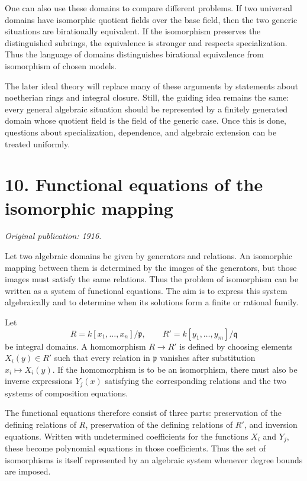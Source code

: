 \documentclass[12pt]{article}
\begin{document}
One can also use these domains to compare different problems. If two universal domains have
isomorphic quotient fields over the base field, then the two generic situations are birationally
equivalent. If the isomorphism preserves the distinguished subrings, the equivalence is stronger and
respects specialization. Thus the language of domains distinguishes birational equivalence from
isomorphism of chosen models.

The later ideal theory will replace many of these arguments by statements about noetherian rings and
integral closure. Still, the guiding idea remains the same: every general algebraic situation should
be represented by a finitely generated domain whose quotient field is the field of the generic case.
Once this is done, questions about specialization, dependence, and algebraic extension can be
treated uniformly.


\section{10. Functional equations of the isomorphic mapping}

\textit{Original publication: 1916.}

Let two algebraic domains be given by generators and relations. An isomorphic mapping between them
is determined by the images of the generators, but those images must satisfy the same relations.
Thus the problem of isomorphism can be written as a system of functional equations. The aim is to
express this system algebraically and to determine when its solutions form a finite or rational
family.


Let \[   R=k[x_1, \ldots,x_n]/\mathfrak p,   \qquad   R'=k[y_1, \ldots,y_m]/\mathfrak q \] be
integral domains. A homomorphism \(R\to R'\) is defined by choosing elements \(X_i(y)\in R'\) such
that every relation in \(\mathfrak p\) vanishes after substitution \(x_i\mapsto X_i(y)\). If the
homomorphism is to be an isomorphism, there must also be inverse expressions \(Y_j(x)\) satisfying
the corresponding relations and the two systems of composition equations.


The functional equations therefore consist of three parts: preservation of the defining relations of
\(R\), preservation of the defining relations of \(R'\), and inversion equations. Written with
undetermined coefficients for the functions \(X_i\) and \(Y_j\), these become polynomial equations
in those coefficients. Thus the set of isomorphisms is itself represented by an algebraic system
whenever degree bounds are imposed.
\end{document}
